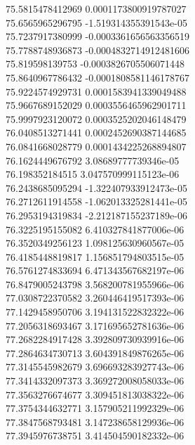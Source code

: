 {75.5815478412969 0.0001173800919787027 \\
75.6565965296795 -1.519314355391543e-05 \\
75.7237917380999 -0.0003361656563356519 \\
75.7788748936873 -0.0004832714912481606 \\
75.819598139753 -0.0003826705506071448 \\
75.8640967786432 -0.0001808581146178767 \\
75.9224574929731 0.0001583941339049488 \\
75.9667689152029 0.0003556465962901711 \\
75.9997923120072 0.0003525202046148479 \\
76.0408513271441 0.0002452690387144685 \\
76.0841668028779 0.0001434225268894807 \\
76.1624449676792 3.08689777739346e-05 \\
76.198352184515 3.047570999115123e-06 \\
76.2438685095294 -1.322407933912473e-05 \\
76.2712611914558 -1.062013325281441e-05 \\
76.2953194319834 -2.212187155237189e-06 \\
76.3225195155082 6.410327841877006e-06 \\
76.3520349256123 1.098125630960567e-05 \\
76.4185448819817 1.156851794803515e-05 \\
76.5761274833694 6.471343567682197e-06 \\
76.8479005243798 3.568200781955966e-06 \\
77.0308722370582 3.260446419517393e-06 \\
77.1429458950706 3.194131522832322e-06 \\
77.2056318693467 3.171695652781636e-06 \\
77.2682284917428 3.392809730939916e-06 \\
77.2864634730713 3.604391849876265e-06 \\
77.3145545982679 3.696693283927743e-06 \\
77.3414332097373 3.369272008058033e-06 \\
77.3563276674677 3.309451813038322e-06 \\
77.3754344632771 3.157905211992329e-06 \\
77.3847568793481 3.147238658129936e-06 \\
77.3945976738751 3.414504590182332e-06 \\
}
